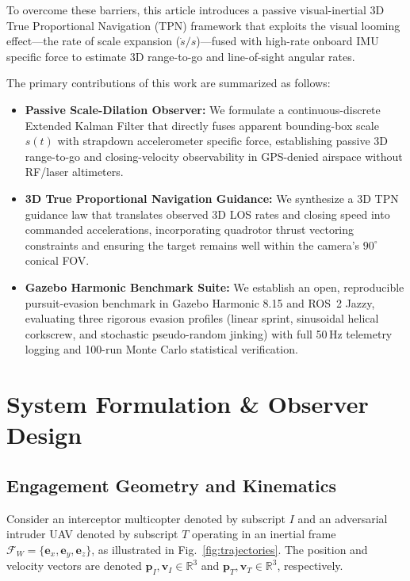 \documentclass[lettersize,journal]{IEEEtran}
\begin{document}
To overcome these barriers, this article introduces a passive visual-inertial 3D True Proportional Navigation (TPN) framework that exploits the visual looming effect—the rate of scale expansion ($\dot{s}/s$)—fused with high-rate onboard IMU specific force to estimate 3D range-to-go and line-of-sight angular rates. 

The primary contributions of this work are summarized as follows:
\begin{itemize}
    \item \textbf{Passive Scale-Dilation Observer:} We formulate a continuous-discrete Extended Kalman Filter that directly fuses apparent bounding-box scale $s(t)$ with strapdown accelerometer specific force, establishing passive 3D range-to-go and closing-velocity observability in GPS-denied airspace without RF/laser altimeters.
    \item \textbf{3D True Proportional Navigation Guidance:} We synthesize a 3D TPN guidance law that translates observed 3D LOS rates and closing speed into commanded accelerations, incorporating quadrotor thrust vectoring constraints and ensuring the target remains well within the camera's $90^\circ$ conical FOV.
    \item \textbf{Gazebo Harmonic Benchmark Suite:} We establish an open, reproducible pursuit-evasion benchmark in Gazebo Harmonic 8.15 and ROS~2 Jazzy, evaluating three rigorous evasion profiles (linear sprint, sinusoidal helical corkscrew, and stochastic pseudo-random jinking) with full 50\,Hz telemetry logging and 100-run Monte Carlo statistical verification.
\end{itemize}

\section{System Formulation \& Observer Design}

\subsection{Engagement Geometry and Kinematics}
Consider an interceptor multicopter denoted by subscript $I$ and an adversarial intruder UAV denoted by subscript $T$ operating in an inertial frame $\mathcal{F}_W = \{\mathbf{e}_x, \mathbf{e}_y, \mathbf{e}_z\}$, as illustrated in Fig.~\ref{fig:trajectories}. The position and velocity vectors are denoted $\mathbf{p}_I, \mathbf{v}_I \in \mathbb{R}^3$ and $\mathbf{p}_T, \mathbf{v}_T \in \mathbb{R}^3$, respectively.
\end{document}

